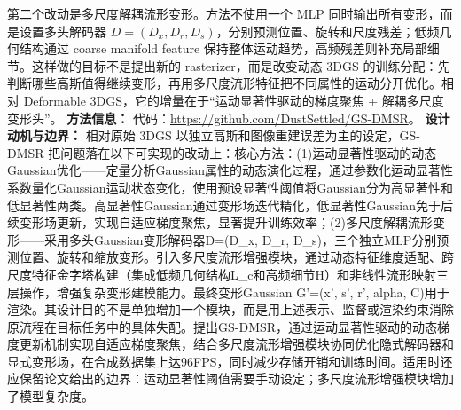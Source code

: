 第二个改动是多尺度解耦流形变形。方法不使用一个 MLP 同时输出所有变形，而是设置多头解码器 $D=(D_x,D_r,D_s)$，分别预测位置、旋转和尺度残差；低频几何结构通过 coarse manifold feature 保持整体运动趋势，高频残差则补充局部细节。这样做的目标不是提出新的 rasterizer，而是改变动态 3DGS 的训练分配：先判断哪些高斯值得继续变形，再用多尺度流形特征把不同属性的运动分开优化。相对 Deformable 3DGS，它的增量在于“运动显著性驱动的梯度聚焦 + 解耦多尺度变形头”。
\textbf{方法信息：} 代码：\url{https://github.com/DustSettled/GS-DMSR}。
\textbf{设计动机与边界：} 相对原始 3DGS 以独立高斯和图像重建误差为主的设定，GS-DMSR 把问题落在以下可实现的改动上：核心方法：(1)运动显著性驱动的动态Gaussian优化——定量分析Gaussian属性的动态演化过程，通过参数化运动显著性系数量化Gaussian运动状态变化，使用预设显著性阈值将Gaussian分为高显著性和低显著性两类。高显著性Gaussian通过变形场迭代精化，低显著性Gaussian免于后续变形场更新，实现自适应梯度聚焦，显著提升训练效率；(2)多尺度解耦流形变形——采用多头Gaussian变形解码器D=(D\_x, D\_r, D\_s)，三个独立MLP分别预测位置、旋转和缩放变形。引入多尺度流形增强模块，通过动态特征维度适配、跨尺度特征金字塔构建（集成低频几何结构L\_c和高频细节H）和非线性流形映射三层操作，增强复杂变形建模能力。最终变形Gaussian G'=(x', s', r', alpha, C)用于渲染。其设计目的不是单独增加一个模块，而是用上述表示、监督或渲染约束消除原流程在目标任务中的具体失配。提出GS-DMSR，通过运动显著性驱动的动态梯度更新机制实现自适应梯度聚焦，结合多尺度流形增强模块协同优化隐式解码器和显式变形场，在合成数据集上达96FPS，同时减少存储开销和训练时间。适用时还应保留论文给出的边界：运动显著性阈值需要手动设定；多尺度流形增强模块增加了模型复杂度。
